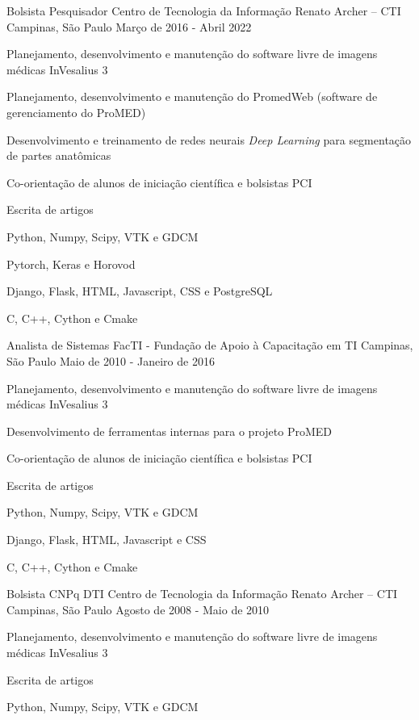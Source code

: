 \begin{cventries}

  \cventry
    {Bolsista Pesquisador}
    {Centro de Tecnologia da Informação Renato Archer – CTI}
    {Campinas, São Paulo}
    {Março de 2016 - Abril 2022}
    {
      \begin{cvitems}
      \item {Planejamento, desenvolvimento e manutenção do software livre de imagens médicas InVesalius 3}
      \item {Planejamento, desenvolvimento e manutenção do PromedWeb (software de gerenciamento do ProMED)}
      \item {Desenvolvimento e treinamento de redes neurais \textit{Deep Learning} para segmentação de partes anatômicas}
      \item {Co-orientação de alunos de iniciação científica e bolsistas PCI}
      \item {Escrita de artigos}
      \item {Python, Numpy, Scipy, VTK e GDCM}
      \item {Pytorch, Keras e Horovod}
      \item {Django, Flask, HTML, Javascript, CSS e PostgreSQL}
      \item {C, C++, Cython e Cmake}
      \end{cvitems}
    }

  \cventry
  {Analista de Sistemas}
  {FacTI - Fundação de Apoio à Capacitação em TI}
  {Campinas, São Paulo}
  {Maio de 2010 - Janeiro de 2016}
  {
    \begin{cvitems}
      \item {Planejamento, desenvolvimento e manutenção do software livre de imagens médicas InVesalius 3}
      \item {Desenvolvimento de ferramentas internas para o projeto ProMED}
      \item {Co-orientação de alunos de iniciação científica e bolsistas PCI}
      \item {Escrita de artigos}
      \item {Python, Numpy, Scipy, VTK e GDCM}
      \item {Django, Flask, HTML, Javascript e CSS}
      \item {C, C++, Cython e Cmake}
      \end{cvitems}
    }

    \cventry
    {Bolsista CNPq DTI}
    {Centro de Tecnologia da Informação Renato Archer – CTI}
    {Campinas, São Paulo}
    {Agosto de 2008 - Maio de 2010}
    {
      \begin{cvitems}
      \item {Planejamento, desenvolvimento e manutenção do software livre de imagens médicas InVesalius 3}
      \item {Escrita de artigos}
      \item {Python, Numpy, Scipy, VTK e GDCM}
      \end{cvitems}
    }


\end{cventries}
